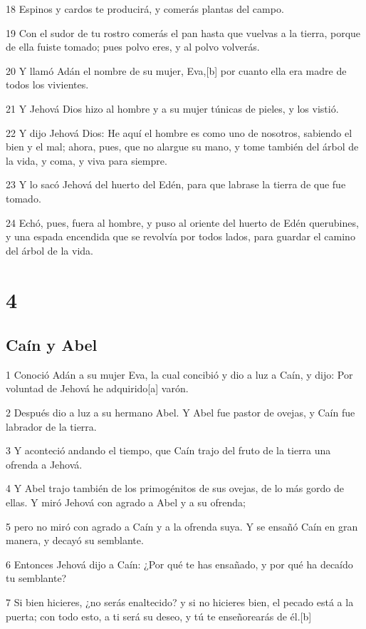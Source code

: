 18 Espinos y cardos te producirá, y comerás plantas del campo.

19 Con el sudor de tu rostro comerás el pan hasta que vuelvas a la tierra, porque de ella fuiste tomado; pues polvo eres, y al polvo volverás.

20 Y llamó Adán el nombre de su mujer, Eva,[b] por cuanto ella era madre de todos los vivientes.

21 Y Jehová Dios hizo al hombre y a su mujer túnicas de pieles, y los vistió.

22 Y dijo Jehová Dios: He aquí el hombre es como uno de nosotros, sabiendo el bien y el mal; ahora, pues, que no alargue su mano, y tome también del árbol de la vida, y coma, y viva para siempre.

23 Y lo sacó Jehová del huerto del Edén, para que labrase la tierra de que fue tomado.

24 Echó, pues, fuera al hombre, y puso al oriente del huerto de Edén querubines, y una espada encendida que se revolvía por todos lados, para guardar el camino del árbol de la vida.

\chapter{4}

\section{Caín y Abel}

1 Conoció Adán a su mujer Eva, la cual concibió y dio a luz a Caín, y dijo: Por voluntad de Jehová he adquirido[a] varón.

2 Después dio a luz a su hermano Abel. Y Abel fue pastor de ovejas, y Caín fue labrador de la tierra.

3 Y aconteció andando el tiempo, que Caín trajo del fruto de la tierra una ofrenda a Jehová.

4 Y Abel trajo también de los primogénitos de sus ovejas, de lo más gordo de ellas. Y miró Jehová con agrado a Abel y a su ofrenda;

5 pero no miró con agrado a Caín y a la ofrenda suya. Y se ensañó Caín en gran manera, y decayó su semblante.

6 Entonces Jehová dijo a Caín: ¿Por qué te has ensañado, y por qué ha decaído tu semblante?

7 Si bien hicieres, ¿no serás enaltecido? y si no hicieres bien, el pecado está a la puerta; con todo esto, a ti será su deseo, y tú te enseñorearás de él.[b]

